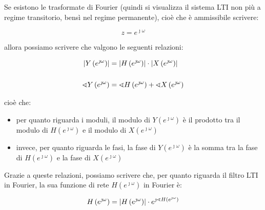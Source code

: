 Se esistono le trasformate di Fourier (quindi si visualizza il sistema LTI non più a regime transitorio, bensì nel regime permanente), 
cioè che è ammissibile scrivere: 

{
    \Large 
    \begin{equation}
        z = e^{\jmath \omega}
    \end{equation}
}

allora possiamo scrivere che valgono le seguenti relazioni: 

{
    \Large 
    \begin{equation}
        \begin{split}
            \abs{Y \left(e^{\jmath \omega}\right)}
            &= 
            \abs{H \left(e^{\jmath \omega}\right)}
            \cdot 
            \abs{X \left(e^{\jmath \omega}\right)}
            \\
            &\quad
            \\
            \sphericalangle Y \left(e^{\jmath \omega}\right)
            &= 
            \sphericalangle H \left(e^{\jmath \omega}\right)
            +
            \sphericalangle X \left(e^{\jmath \omega}\right) 
        \end{split}
    \end{equation}
}

cioè che: 

\begin{itemize}
    \item per quanto riguarda i moduli, il modulo di $Y \left(e^{\jmath \omega}\right)$ è il prodotto tra il modulo di $H \left(e^{\jmath \omega}\right)$ e il modulo di $X \left(e^{\jmath \omega}\right)$ 
    \item invece, per quanto riguarda le fasi, la fase di $Y \left(e^{\jmath \omega}\right)$ è la somma tra la fase di $H \left(e^{\jmath \omega}\right)$ e la fase di $X \left(e^{\jmath \omega}\right)$ 
\end{itemize}

Grazie a queste relazioni, possiamo scrivere che, per quanto riguarda il filtro LTI in Fourier, 
la sua funzione di rete $H \left( e^{\jmath \omega}\right)$ in Fourier è: 

{
    \Large 
    \begin{equation}
        H \left( e^{\jmath \omega}\right)
        = 
        \abs{H \left( e^{\jmath \omega}\right)}
        \cdot 
        e^{\jmath \sphericalangle H \left( e^{\jmath \omega}\right)}
    \end{equation}
}

